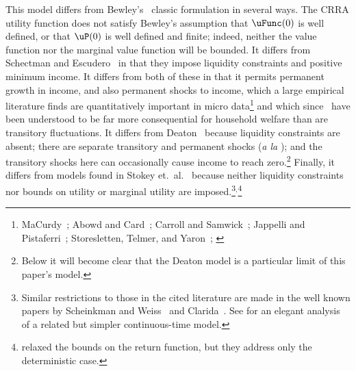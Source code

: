 \documentclass[BufferStockTheory]{subfiles}
\begin{document}
\begin{comment}
  Combining the transition equations, the recursive nature of
  the problem allows us to rewrite it more compactly in Bellman equation form,
  \begin{align*}
    \VFunc_{t}(\mLevBF_{t},\pLevBF_{t})  & = \max_{\cLevBF_{t}}~\left\{\uFunc(\cLevBF_{t})+\DiscFac \Ex_{t}\left[ \VFunc_{t+1}((\mLevBF_{t}-\cLevBF_{t})\Rfree+ \pLevBF_{t+1}\tShkAll_{t+1},\pLevBF_{t} \PGro  \pShk_{t+1})\right]\right\}
                                           .
  \end{align*}
\end{comment}

\hypertarget{DiffWithLit}{} This model differs from Bewley's~\citeyearpar{bewleyPIH} classic formulation in several ways. The CRRA utility function does not satisfy Bewley's assumption that $\uFunc(0)$ is well defined, or that $\uP(0)$ is well defined and finite; indeed, neither the value function nor the marginal value function will be bounded.  It differs from Schectman and Escudero~\citeyearpar{seIncFluct} in that they impose liquidity constraints and positive minimum income.  It differs from both of these in that it permits permanent growth in income, and also permanent shocks to income, which a large empirical literature finds are quantitatively important in micro data\footnote{MaCurdy~\citeyearpar{macurdyTimeseries}; Abowd and Card~\citeyearpar{acCovariance}; Carroll and Samwick~\citeyearpar{csNature}; Jappelli and Pistaferri~\citeyearpar{jpCins}; Storesletten, Telmer, and Yaron~\citeyearpar{styConsumption}; \cite{blpRisk}} and which since~\cite{friedmanATheory} have been understood to be far more consequential for household welfare than are transitory fluctuations.  It differs from Deaton~\citeyearpar{deatonLiqConstr} because liquidity constraints are absent; there are separate transitory and permanent shocks ({\it a la} \cite{muthOptimal}); and the transitory shocks here can occasionally cause income to reach zero.\footnote{Below it will become clear that the Deaton model is a particular limit of this paper's model.}  Finally, it differs from models found in Stokey et.\ al.~\citeyearpar{slpMethods} because neither liquidity constraints nor bounds on utility or marginal utility are imposed.\footnote{Similar restrictions to those in the cited literature are made in the well known papers by Scheinkman and Weiss~\citeyearpar{scheinkman&weiss:borrowing} and Clarida~\citeyearpar{claridaErgodic}.  See \cite{tocheUrisk} for an elegant analysis of a related but simpler continuous-time model.}$^{,}$\footnote{\cite{asHomogeneous} relaxed the bounds on the return function, but they address only the deterministic case.}
\end{document}
